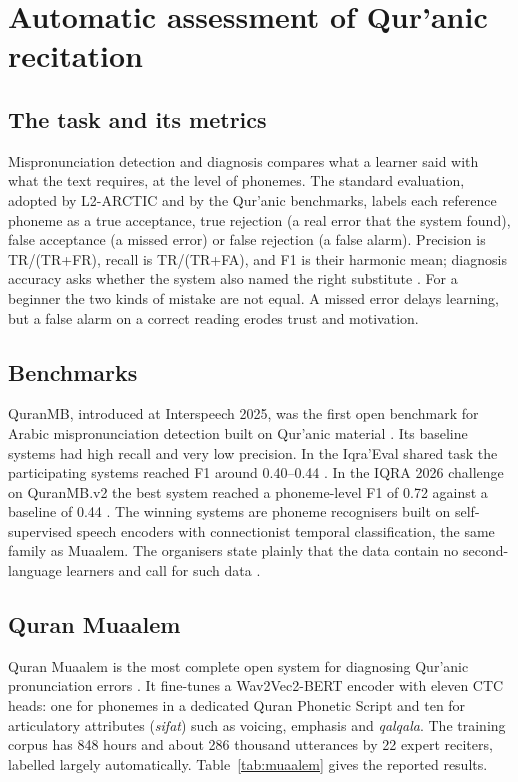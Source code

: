 \documentclass[a4paper,14pt]{extarticle}
\begin{document}
\section{Automatic assessment of Qur'anic recitation}

\subsection{The task and its metrics}

Mispronunciation detection and diagnosis compares what a learner said with what the text requires, at
the level of phonemes. The standard evaluation, adopted by L2-ARCTIC and by the Qur'anic benchmarks,
labels each reference phoneme as a true acceptance, true rejection (a real error that the system
found), false acceptance (a missed error) or false rejection (a false alarm). Precision is
TR/(TR+FR), recall is TR/(TR+FA), and F1 is their harmonic mean; diagnosis accuracy asks whether the
system also named the right substitute \cite{SRC-063,SRC-064}. For a beginner the two kinds of
mistake are not equal. A missed error delays learning, but a false alarm on a correct reading erodes
trust and motivation.

\subsection{Benchmarks}

QuranMB, introduced at Interspeech 2025, was the first open benchmark for Arabic mispronunciation
detection built on Qur'anic material \cite{SRC-004}. Its baseline systems had high recall and very low
precision. In the Iqra'Eval shared task the participating systems reached F1 around 0.40--0.44
\cite{SRC-043}. In the IQRA 2026 challenge on QuranMB.v2 the best system reached a phoneme-level F1 of
0.72 against a baseline of 0.44 \cite{SRC-031,SRC-086}. The winning systems are phoneme recognisers built
on self-supervised speech encoders with connectionist temporal classification, the same family as
Muaalem. The organisers state plainly that the data contain no second-language learners and call for
such data \cite{SRC-031}.

\subsection{Quran Muaalem}

Quran Muaalem is the most complete open system for diagnosing Qur'anic pronunciation errors
\cite{SRC-002,SRC-003}. It fine-tunes a Wav2Vec2-BERT encoder with eleven CTC heads: one for phonemes in a
dedicated Quran Phonetic Script and ten for articulatory attributes (\emph{sifat}) such as voicing,
emphasis and \emph{qalqala}. The training corpus has 848 hours and about 286 thousand utterances by
22 expert reciters, labelled largely automatically. Table~\ref{tab:muaalem} gives the reported results.
\end{document}
